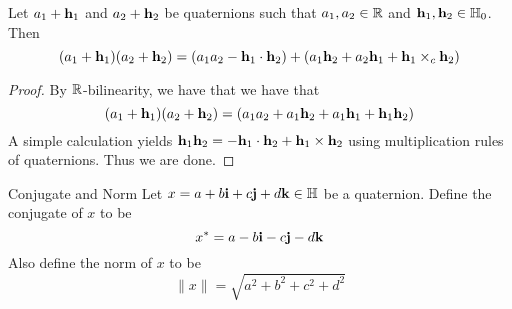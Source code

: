 \documentclass[a4paper]{article}
\begin{document}
\begin{prp}{}{} Let $a_1+\vb{h}_1$ and $a_2+\vb{h}_2$ be quaternions such that $a_1,a_2\in\mathbb{R}$ and $\vb{h}_1,\vb{h}_2\in\mathbb{H}_0$. Then $$(a_1+\vb{h}_1)(a_2+\vb{h}_2)=(a_1a_2-\vb{h}_1\cdot\vb{h}_2)+(a_1\vb{h}_2+a_2\vb{h}_1+\vb{h}_1\times_c\vb{h}_2)$$ \tcbline
\begin{proof}
By $\mathbb{R}$-bilinearity, we have that we have that $$(a_1+\vb{h}_1)(a_2+\vb{h}_2)=(a_1a_2+a_1\vb{h}_2+a_1\vb{h}_1+\vb{h}_1\vb{h}_2)$$ A simple calculation yields $\vb{h}_1\vb{h}_2=-\vb{h}_1\cdot\vb{h}_2+\vb{h}_1\times\vb{h}_2$ using multiplication rules of quaternions. Thus we are done. 
\end{proof}
\end{prp}

\begin{defn}{Conjugate and Norm}{} Let $x=a+b\vb{i}+c\vb{j}+d\vb{k}\in\mathbb{H}$ be a quaternion. Define the conjugate of $x$ to be $$x^\ast=a-b\vb{i}-c\vb{j}-d\vb{k}$$ Also define the norm of $x$ to be $$\|x\|=\sqrt{a^2+b^2+c^2+d^2}$$
\end{defn}
\end{document}
